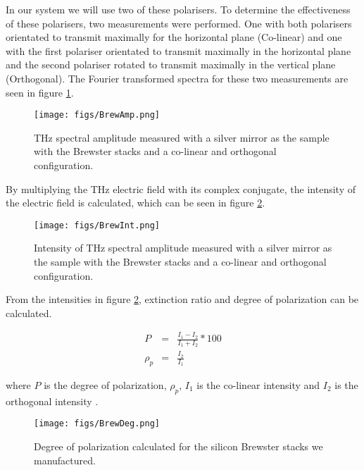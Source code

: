In our system we will use two of these polarisers. To determine the effectiveness of these polarisers, two measurements were performed. One with both polarisers orientated to transmit maximally for the horizontal plane (Co-linear) and one with the first polariser orientated to transmit maximally in the horizontal plane and the second polariser rotated to transmit maximally in the vertical plane (Orthogonal). The Fourier transformed spectra for these two measurements are seen in figure \ref{fig:BrewAmp}.

\begin{figure}[H]
\begin{center}
	 \texttt{[image: figs/BrewAmp.png]}
	 \caption[Spectrum of orthogonal and co-linear Brewster stack pairs]{THz spectral amplitude measured with a silver mirror as the sample with the Brewster stacks and a co-linear and orthogonal configuration.}
   \label{fig:BrewAmp}
\end{center}
\end{figure}

By multiplying the THz electric field with its complex conjugate, the intensity of the electric field is calculated, which can be seen in figure \ref{fig:BrewInt}.

\begin{figure}[H]
\begin{center}
	 \texttt{[image: figs/BrewInt.png]}
	 \caption[Intensity spectrum of orthogonal and co-linear Brewster stack pairs]{Intensity of THz spectral amplitude measured with a silver mirror as the sample with the Brewster stacks and a co-linear and orthogonal configuration.}
   \label{fig:BrewInt}
\end{center}
\end{figure}

From the intensities in figure \ref{fig:BrewInt}, extinction ratio and degree of polarization can be calculated.

\begin{eqnarray}
P &=& \frac{I_{1} - I_{2}}{I_{1} + I_{2}} * 100\\
\rho_{p} &=& \frac{I_{2}}{I_{1}}
\label{eq:DePol}
\end{eqnarray}

where $P$ is the degree of polarization, $\rho_{p}$, $I_{1}$ is the co-linear intensity and $I_{2}$ is the orthogonal intensity \cite{Bass2010}.

\begin{figure}[H]
\begin{center}
	 \texttt{[image: figs/BrewDeg.png]}
	 \caption[Degree of polarization calculated for the silicon Brewster stacks]{Degree of polarization calculated for the silicon Brewster stacks we manufactured.}
   \label{fig:BrewDeg}
\end{center}
\end{figure}

